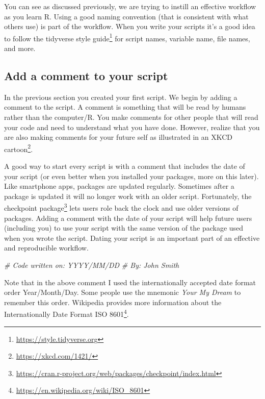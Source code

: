 \documentclass[
]{krantz}
\makeatletter
\newenvironment{Shaded}{\begin{snugshade}}{\end{snugshade}}
\newcommand{\CommentTok}[1]{\textcolor[rgb]{0.37,0.37,0.37}{\textit{#1}}}
\renewcommand{\href}[2]{#2\footnote{\url{#1}}}
\newenvironment{kframe}{%
\medskip{}
\setlength{\fboxsep}{.8em}
 \def\at@end@of@kframe{}%
 \ifinner\ifhmode%
  \def\at@end@of@kframe{\end{minipage}}%
  \begin{minipage}{\columnwidth}%
 \fi\fi%
 \def\FrameCommand##1{\hskip\@totalleftmargin \hskip-\fboxsep
 \colorbox{shadecolor}{##1}\hskip-\fboxsep
     \hskip-\linewidth \hskip-\@totalleftmargin \hskip\columnwidth}%
 \MakeFramed {\advance\hsize-\width
   \@totalleftmargin\z@ \linewidth\hsize
   \@setminipage}}%
 {\par\unskip\endMakeFramed%
 \at@end@of@kframe}
\renewenvironment{Shaded}{\begin{kframe}}{\end{kframe}}
\makeatother
\begin{document}
You can see as discussed previously, we are trying to instill an effective workflow as you learn R. Using a good naming convention (that is consistent with what others use) is part of the workflow. When you write your scripts it's a good idea to follow the \href{https://style.tidyverse.org}{tidyverse style guide} for script names, variable name, file names, and more.

\hypertarget{add-a-comment-to-your-script}{%
\subsection{Add a comment to your script}\label{add-a-comment-to-your-script}}

In the previous section you created your first script. We begin by adding a comment to the script. A comment is something that will be read by humans rather than the computer/R. You make comments for other people that will read your code and need to understand what you have done. However, realize that you are also making comments for your future self as illustrated in an \href{https://xkcd.com/1421/}{XKCD cartoon}.

A good way to start every script is with a comment that includes the date of your script (or even better when you installed your packages, more on this later). Like smartphone apps, packages are updated regularly. Sometimes after a package is updated it will no longer work with an older script. Fortunately, the \href{https://cran.r-project.org/web/packages/checkpoint/index.html}{checkpoint package} lets users role back the clock and use older versions of packages. Adding a comment with the date of your script will help future users (including you) to use your script with the same version of the package used when you wrote the script. Dating your script is an important part of an effective and reproducible workflow.

\begin{Shaded}
\begin{Highlighting}[]
\CommentTok{# Code written on: YYYY/MM/DD }
\CommentTok{# By: John Smith}
\end{Highlighting}
\end{Shaded}

Note that in the above comment I used the internationally accepted date format order Year/Month/Day. Some people use the mnemonic \emph{Your My Dream} to remember this order. Wikipedia provides more information about the \href{https://en.wikipedia.org/wiki/ISO_8601}{Internationally Date Format ISO 8601}.
\end{document}
